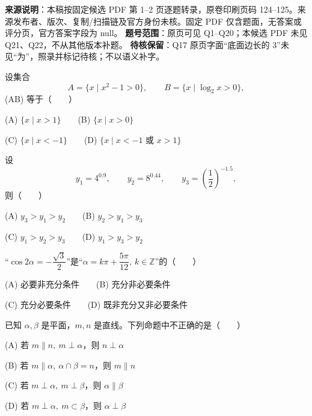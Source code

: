 

\begin{gktip}
\textbf{来源说明}：本稿按固定候选 PDF 第 1–2 页逐题转录，原卷印刷页码 124–125。来源发布者、版次、复制/扫描链及官方身份未核。固定 PDF 仅含题面，无答案或评分页，官方答案字段为 null。
\textbf{题号范围}：原页可见 Q1–Q20；本候选 PDF 未见 Q21、Q22，不从其他版本补题。
\textbf{待核保留}：Q17 原页字面“底面边长的 3”未见“为”，照录并标记待核；不以语义补字。
\end{gktip}


\begin{question}
设集合
\nopagebreak[4]
\[
   A=\{x\mid x^2-1>0\},\qquad B=\{x\mid \log_2x>0\},
\]
   (A\cap B) 等于\mbox{（　　）}

   (A) \(\{x\mid x>1\}\)　　(B) \(\{x\mid x>0\}\)

   (C) \(\{x\mid x<-1\}\)　　(D) \(\{x\mid x<-1\text{ 或 }x>1\}\)

\end{question}
\begin{question}
设
\nopagebreak[4]
\[
   y_1=4^{0.9},\qquad y_2=8^{0.44},\qquad y_3=\left(\frac12\right)^{-1.5},
\]
   则\mbox{（　　）}

   (A) \(y_3>y_1>y_2\)　　(B) \(y_2>y_1>y_3\)

   (C) \(y_1>y_2>y_3\)　　(D) \(y_1>y_3>y_2\)

\end{question}
\begin{question}
“\(\cos 2\alpha=-\dfrac{\sqrt3}{2}\)”是“\(\alpha=k\pi+\dfrac{5\pi}{12},\ k\in\mathbb Z\)”的\mbox{（　　）}

   (A) 必要非充分条件　　(B) 充分非必要条件

   (C) 充分必要条件　　(D) 既非充分又非必要条件

\end{question}
\begin{question}
已知 \(\alpha,\beta\) 是平面，\(m,n\) 是直线。下列命题中不正确的是\mbox{（　　）}

   (A) 若 \(m\parallel n,\ m\perp\alpha\)，则 \(n\perp\alpha\)

   (B) 若 \(m\parallel\alpha,\ \alpha\cap\beta=n\)，则 \(m\parallel n\)

   (C) 若 \(m\perp\alpha,\ m\perp\beta\)，则 \(\alpha\parallel\beta\)

   (D) 若 \(m\perp\alpha,\ m\subset\beta\)，则 \(\alpha\perp\beta\)

\end{question}
